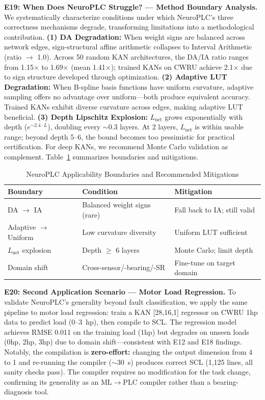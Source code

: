 \documentclass[journal,onecolumn]{IEEEtran}
\begin{document}
\noindent\textbf{E19: When Does NeuroPLC Struggle? --- Method Boundary Analysis.}
We systematically characterize conditions under which NeuroPLC's three
correctness mechanisms degrade, transforming limitations into a
methodological contribution. \textbf{(1) DA Degradation:} When weight
signs are balanced across network edges, sign-structural affine arithmetic collapses
to Interval Arithmetic (ratio $\rightarrow$ 1.0). Across 50 random KAN
architectures, the DA/IA ratio ranges from 1.15$\times$ to
1.69$\times$ (mean 1.41$\times$); trained KANs on CWRU achieve
2.1$\times$ due to sign structure developed through optimization.
\textbf{(2) Adaptive LUT Degradation:} When B-spline basis functions
have uniform curvature, adaptive sampling offers no advantage over
uniform---both produce equivalent accuracy. Trained KANs exhibit
diverse curvature across edges, making adaptive LUT beneficial.
\textbf{(3) Depth Lipschitz Explosion:} $L_{\text{net}}$ grows
exponentially with depth ($e^{\sim 2.4\cdot L}$), doubling every
$\sim$0.3 layers. At 2 layers, $L_{\text{net}}$ is within usable range;
beyond depth 5--6, the bound becomes too pessimistic for practical
certification. For deep KANs, we recommend Monte Carlo validation as
complement. Table~\ref{tab:boundaries} summarizes boundaries and
mitigations.

\begin{table}[t]
\centering
\caption{NeuroPLC Applicability Boundaries and Recommended Mitigations}
\label{tab:boundaries}
\footnotesize
\begin{tabular}{@{}p{1.9cm}p{2.9cm}p{2.9cm}@{}}
\toprule
\textbf{Boundary} & \textbf{Condition} & \textbf{Mitigation} \\
\midrule
DA $\rightarrow$ IA & Balanced weight signs (rare) & Fall back to IA; still valid \\
\addlinespace
Adaptive $\rightarrow$ Uniform & Low curvature diversity & Uniform LUT sufficient \\
\addlinespace
$L_{\text{net}}$ explosion & Depth $\geq$ 6 layers & Monte Carlo; limit depth \\
\addlinespace
Domain shift & Cross-sensor/-bearing/-SR & Fine-tune on target domain \\
\bottomrule
\end{tabular}
\end{table}

\noindent\textbf{E20: Second Application Scenario --- Motor Load Regression.}
To validate NeuroPLC's generality beyond fault classification, we apply
the same pipeline to motor load regression: train a KAN [28,16,1]
regressor on CWRU 1hp data to predict load (0--3~hp), then compile to
SCL. The regression model achieves RMSE 0.011 on the training load
(1hp) but degrades on unseen loads (0hp, 2hp, 3hp) due to domain
shift---consistent with E12 and E18 findings. Notably, the
compilation is \textbf{zero-effort:} changing the output dimension from
4 to 1 and re-running the compiler ($\sim$30~s) produces correct SCL
(1,125 lines, all sanity checks pass). The compiler requires no
modification for the task change, confirming its generality as an
ML$\rightarrow$PLC compiler rather than a bearing-diagnosis tool.
\end{document}
